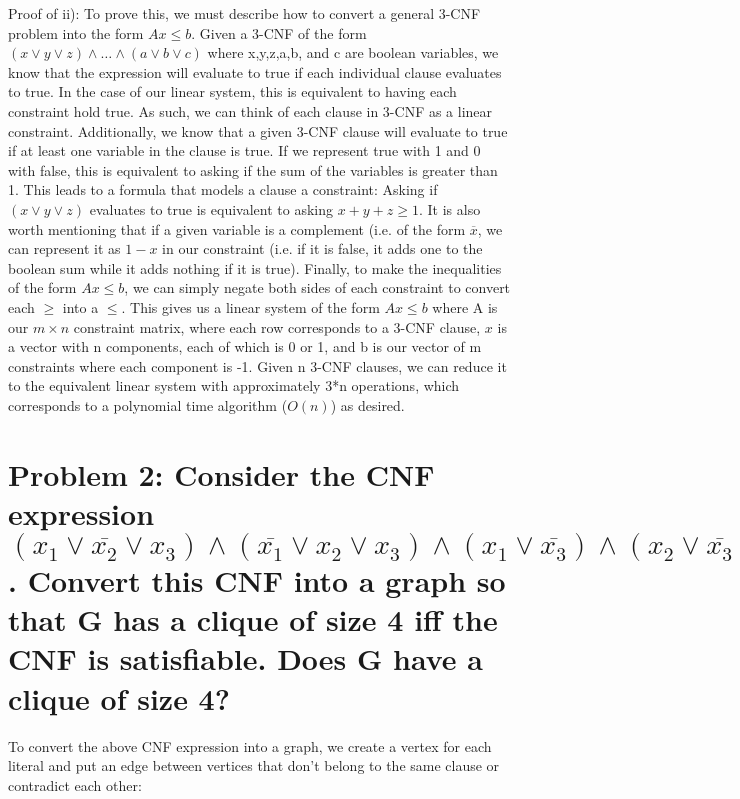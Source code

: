 \documentclass{article}
\begin{document}
Proof of ii): To prove this, we must describe how to convert a general 3-CNF problem into the form $Ax \leq b$. Given a 3-CNF of the form $(x \vee y  \vee z) \wedge \dots \wedge (a \vee b \vee c)$ where x,y,z,a,b, and c are boolean variables, we know that the expression will evaluate to true if each individual clause evaluates to true. In the case of our linear system, this is equivalent to having each constraint hold true. As such, we can think of each clause in 3-CNF as a linear constraint. Additionally, we know that a given 3-CNF clause will evaluate to true if at least one variable in the clause is true. If we represent true with 1 and 0 with false, this is equivalent to asking if the sum of the variables is greater than 1. This leads to a formula that models a clause a constraint: Asking if $(x \vee y  \vee z)$ evaluates to true is equivalent to asking $x + y + z \geq 1$. It is also worth mentioning that if a given variable is a complement (i.e. of the form $\overline{x}$, we can represent it as $1-x$ in our constraint (i.e. if it is false, it adds one to the boolean sum while it adds nothing if it is true). Finally, to make the inequalities of the form $Ax \leq b$, we can simply negate both sides of each constraint to convert each $\geq$ into a $\leq$. This gives us a linear system of the form $Ax \leq b$ where A is our $m \times n$ constraint matrix, where each row corresponds to a 3-CNF clause, $x$ is a vector with n components, each of which is 0 or 1, and b is our vector of m constraints where each component is -1. Given n 3-CNF clauses, we can reduce it to the equivalent linear system with approximately 3*n operations, which corresponds to a polynomial time algorithm ($O(n)$) as desired. 

\section*{Problem 2: Consider the CNF expression $(x_1 \vee \overline{x_2} \vee x_3) \wedge (\overline{x_1} \vee x_2 \vee x_3) \wedge (x_1 \vee \overline{x_3}) \wedge (x_2 \vee \overline{x_3} \vee x_4)$. Convert this CNF into a graph so that G has a clique of size 4 iff the CNF is satisfiable. Does G have a clique of size 4?}
To convert the above CNF expression into a graph, we create a vertex for each literal and put an edge between vertices that don't belong to the same clause or contradict each other: \\
\end{document}

